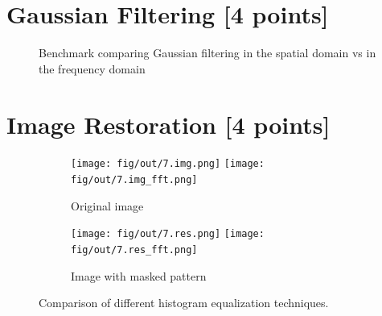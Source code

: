 \documentclass[tikz,14pt,fleqn]{article}
\begin{document}
\section{Gaussian Filtering [4 points]}
\begin{figure}[h!]
    \centering
{}
\caption{Benchmark comparing Gaussian filtering in the spatial domain vs in the frequency domain}
\end{figure}



\section{Image Restoration [4 points]}

\begin{figure}[h!]
    \centering
    \begin{subfigure}{0.27\textwidth}
        \centering
        \texttt{[image: fig/out/7.img.png]}
        \texttt{[image: fig/out/7.img\_fft.png]}
        \caption{Original image}
    \end{subfigure}
    \begin{subfigure}{0.27\textwidth}
        \centering
        \texttt{[image: fig/out/7.res.png]}
        \texttt{[image: fig/out/7.res\_fft.png]}
        \caption{Image with masked pattern}
    \end{subfigure}
    \caption{Comparison of different histogram equalization techniques.}
\end{figure}
\end{document}

